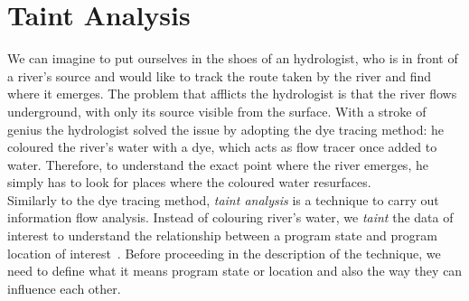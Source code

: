 \documentclass[LaM,binding=0.6cm]{sapthesis}
\begin{document}
\section{Taint Analysis}
\label{sec:taintanalysis}
We can imagine to put ourselves in the shoes of an hydrologist, who is in front of a river's source and would like to track the route taken by the river and find where it emerges. The problem that afflicts the hydrologist is that the river flows underground, with only its source visible from the surface. With a stroke of genius the hydrologist solved the issue by adopting the dye tracing method: he coloured the river's water with a dye, which acts as flow tracer once added to water. Therefore, to understand the exact point where the river emerges, he simply has to look for places where the coloured water resurfaces.\\

Similarly to the dye tracing method, \textit{taint analysis} is a technique to carry out information flow analysis. Instead of colouring river's water, we \textit{taint} the data of interest to understand the relationship between a program state and program location of interest~\cite{Practicalbinaryanalysis}. Before proceeding in the description of the technique, we need to define what it means program state or location and also the way they can influence each other.\\
\end{document}

